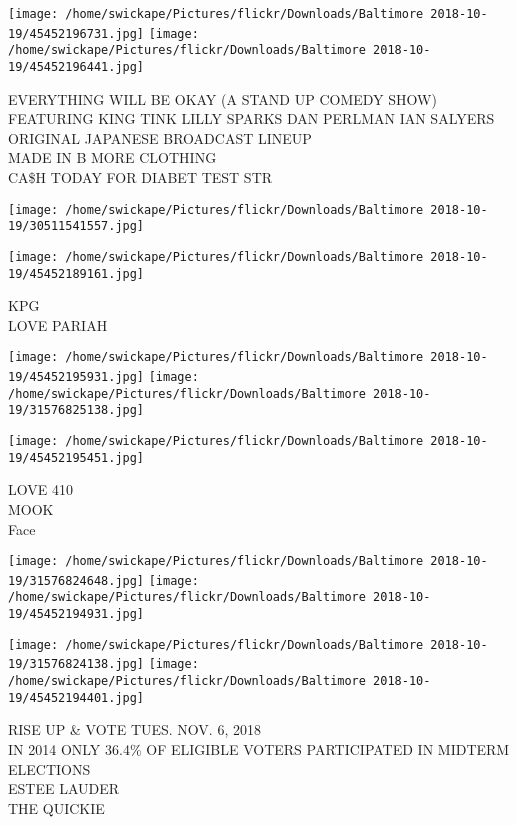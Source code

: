 \documentclass[10pt,letterpaper]{article}
\begin{document}
\texttt{[image: /home/swickape/Pictures/flickr/Downloads/Baltimore 2018-10-19/45452196731.jpg]}
\texttt{[image: /home/swickape/Pictures/flickr/Downloads/Baltimore 2018-10-19/45452196441.jpg]}

EVERYTHING WILL BE OKAY (A STAND UP COMEDY SHOW) FEATURING KING TINK LILLY SPARKS DAN PERLMAN IAN SALYERS\\
ORIGINAL JAPANESE BROADCAST LINEUP\\
MADE IN B MORE CLOTHING\\
CA\$H TODAY FOR DIABET TEST STR\\
\pagebreak

\texttt{[image: /home/swickape/Pictures/flickr/Downloads/Baltimore 2018-10-19/30511541557.jpg]}

\vspace{0.25in}
\texttt{[image: /home/swickape/Pictures/flickr/Downloads/Baltimore 2018-10-19/45452189161.jpg]}

KPG\\
LOVE PARIAH\\
\pagebreak

\texttt{[image: /home/swickape/Pictures/flickr/Downloads/Baltimore 2018-10-19/45452195931.jpg]}
\texttt{[image: /home/swickape/Pictures/flickr/Downloads/Baltimore 2018-10-19/31576825138.jpg]}

\vspace{0.25in}
\texttt{[image: /home/swickape/Pictures/flickr/Downloads/Baltimore 2018-10-19/45452195451.jpg]}

LOVE 410\\
MOOK\\
Face\\
\pagebreak

\texttt{[image: /home/swickape/Pictures/flickr/Downloads/Baltimore 2018-10-19/31576824648.jpg]}
\texttt{[image: /home/swickape/Pictures/flickr/Downloads/Baltimore 2018-10-19/45452194931.jpg]}

\texttt{[image: /home/swickape/Pictures/flickr/Downloads/Baltimore 2018-10-19/31576824138.jpg]}
\texttt{[image: /home/swickape/Pictures/flickr/Downloads/Baltimore 2018-10-19/45452194401.jpg]}

RISE UP \& VOTE TUES. NOV. 6, 2018\\
IN 2014 ONLY 36.4\% OF ELIGIBLE VOTERS PARTICIPATED IN MIDTERM ELECTIONS\\
ESTEE LAUDER\\
THE QUICKIE\\
\pagebreak
\end{document}
